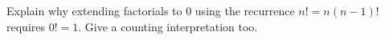 Explain why extending factorials to 0 using the recurrence $ n!=n(n-1)!$ requires $ 0!=1 $. Give a counting interpretation too.
